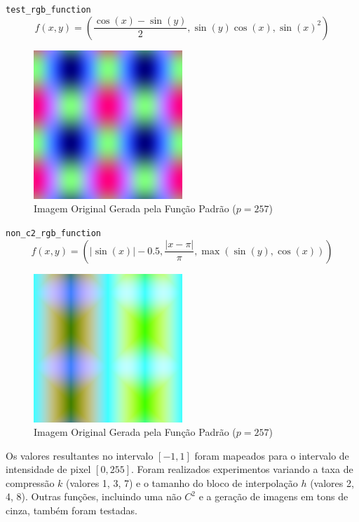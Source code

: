 \documentclass[12pt, a4paper]{article}
\begin{document}
\newpage

\texttt{test\_rgb\_function}
$$ f(x,y) = \left( \frac{\cos(x)-\sin(y)}{2}, \sin(y)\cos(x), \sin(x)^2 \right) $$

\begin{figure}[H]
    \centering
    \includegraphics[width=0.5\textwidth]{results/case_2/base_image.png}
    \caption{Imagem Original Gerada pela Função Padrão ($p=257$)}
    \label{fig:zoo_original_test}
\end{figure}

\texttt{non\_c2\_rgb\_function}
$$ f(x,y) = \left( |\sin(x)| - 0.5, \frac{|x-\pi|}{\pi}, \max(\sin(y), \cos(x)) \right) $$

\begin{figure}[H]
    \centering
    \includegraphics[width=0.5\textwidth]{results/case_4/base_image.png}
    \caption{Imagem Original Gerada pela Função Padrão ($p=257$)}
    \label{fig:zoo_original_non_c2}
\end{figure}

Os valores resultantes no intervalo $[-1, 1]$ foram mapeados para o intervalo de intensidade de pixel $[0, 255]$. Foram realizados experimentos variando a taxa de compressão $k$ (valores 1, 3, 7) e o tamanho do bloco de interpolação $h$ (valores 2, 4, 8). Outras funções, incluindo uma não $C^2$ e a geração de imagens em tons de cinza, também foram testadas.
\end{document}
